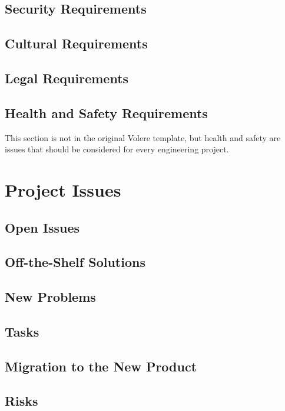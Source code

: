 \documentclass[12pt, titlepage]{article}
\begin{document}
\subsection{Security Requirements}

\subsection{Cultural Requirements}

\subsection{Legal Requirements}

\subsection{Health and Safety Requirements}

This section is not in the original Volere template, but health and safety are
issues that should be considered for every engineering project.

\section{Project Issues}

\subsection{Open Issues}

\subsection{Off-the-Shelf Solutions}

\subsection{New Problems}

\subsection{Tasks}

\subsection{Migration to the New Product}

\subsection{Risks}
\end{document}
